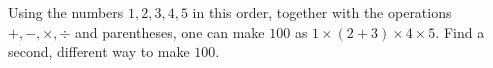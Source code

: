 Using the numbers $1,2,3,4,5$ in this order, together with the operations $+,-,\times,\div$ and parentheses, one can make $100$ as $1\times(2+3)\times4\times5$. Find a second, different way to make $100$.
